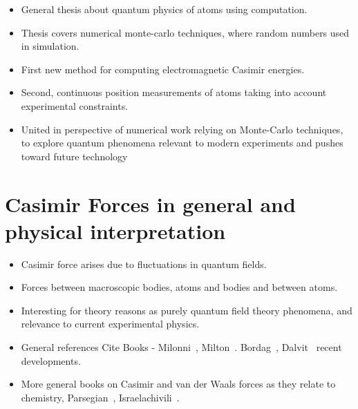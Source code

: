 

\begin{itemize}
\item General thesis about quantum physics of atoms using computation.  
\item Thesis covers numerical monte-carlo techniques, where random numbers used in simulation.
\item First new method for computing electromagnetic Casimir energies.
\item Second, continuous position measurements of atoms taking into account experimental constraints.  
\item United in perspective of numerical work relying on Monte-Carlo techniques,
 to explore quantum phenomena relevant to modern experiments and pushes toward future technology  
\end{itemize}



\section{Casimir Forces in general and physical interpretation}

\begin{itemize}
\item Casimir force arises due to fluctuations in quantum fields. 
\item Forces between macroscopic bodies, atoms and bodies and between atoms.  
\item Interesting for theory reasons as purely quantum field theory phenomena, 
  and relevance to current experimental physics.  
\end{itemize}


\begin{itemize}
\item General references Cite Books - Milonni~\cite{Milonni1994}, Milton~\cite{Milton2001}.
  Bordag~\cite{Bordag2009}, Dalvit~\cite{Dalvit2011} recent developments.  
\item More general books on Casimir and van der Waals forces as they relate to chemistry, 
  Parsegian~\cite{Parsegian2006}, Israelachivili~\cite{Israelachvili2011}.
\end{itemize}


